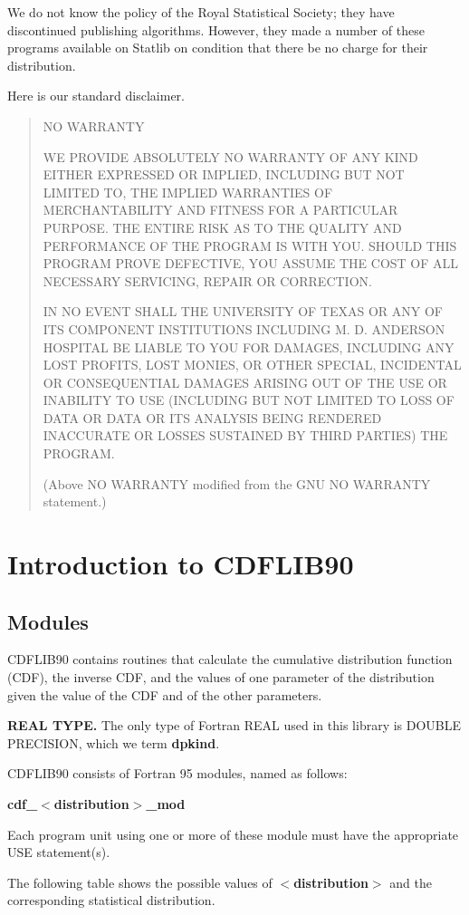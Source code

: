 \documentclass[12pt,dvips]{article}
\newcommand{\meta}[1]{{\ensuremath{<}}#1{\ensuremath{{>}}}}
\newcommand{\mysection}[1]{\color{blue}
             \section{#1} \normalcolor}
\newcommand{\mysubsection}[1] {\color{green}
             \subsection{#1} \normalcolor}
\begin{document}
We do not know the policy  of the Royal Statistical Society; they have
discontinued publishing  algorithms.  However,  they made a  number of
these  programs available  on Statlib  on condition  that there  be no
charge for their distribution.

Here is our standard disclaimer.

\begin{quote}

{\centering NO WARRANTY\\}

WE PROVIDE ABSOLUTELY  NO WARRANTY  OF ANY  KIND  EITHER  EXPRESSED OR
IMPLIED,  INCLUDING BUT   NOT LIMITED TO,  THE  IMPLIED  WARRANTIES OF
MERCHANTABILITY AND FITNESS FOR A PARTICULAR PURPOSE.  THE ENTIRE RISK
AS TO THE QUALITY AND PERFORMANCE OF THE PROGRAM IS  WITH YOU.  SHOULD
THIS PROGRAM PROVE  DEFECTIVE, YOU ASSUME  THE COST  OF  ALL NECESSARY
SERVICING, REPAIR OR CORRECTION.

IN NO  EVENT  SHALL THE UNIVERSITY  OF TEXAS OR  ANY  OF ITS COMPONENT
INSTITUTIONS INCLUDING M. D.   ANDERSON HOSPITAL BE LIABLE  TO YOU FOR
DAMAGES, INCLUDING ANY  LOST PROFITS, LOST MONIES,   OR OTHER SPECIAL,
INCIDENTAL   OR  CONSEQUENTIAL DAMAGES   ARISING   OUT  OF  THE USE OR
INABILITY TO USE (INCLUDING BUT NOT LIMITED TO LOSS OF DATA OR DATA OR
ITS ANALYSIS BEING  RENDERED INACCURATE OR  LOSSES SUSTAINED  BY THIRD
PARTIES) THE PROGRAM.

(Above NO WARRANTY modified from the GNU NO WARRANTY statement.)
\end{quote}

\mysection{Introduction to CDFLIB90}

\mysubsection{Modules}

CDFLIB90 contains routines that calculate the cumulative distribution
function (CDF), the inverse CDF, and the values of one parameter of
the distribution given the value of the CDF and of the other parameters.

{\bf REAL TYPE.}   The only type of Fortran REAL  used in this library
is DOUBLE PRECISION, which we term {\bf dpkind}.

CDFLIB90 consists of Fortran 95 modules, named as follows:

{\centering \bf cdf\_\meta{distribution}\_mod\\}

Each program unit using one or more of these module must have the
appropriate USE statement(s).

The following  table shows the  possible values of  {\bf \meta{distribution}}
and the corresponding statistical distribution.
\hspace{0.5in}
\end{document}
